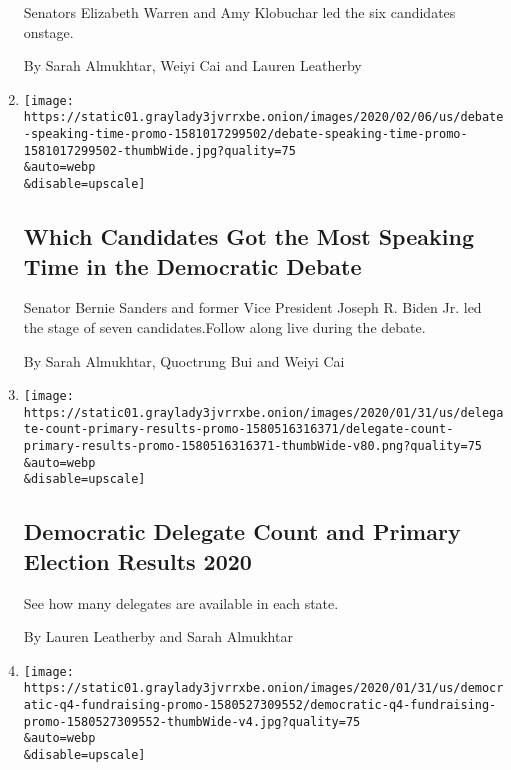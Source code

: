 \begin{enumerate}
  Senators Elizabeth Warren and Amy Klobuchar led the six candidates
  onstage.

  By Sarah Almukhtar, Weiyi Cai and Lauren Leatherby
\item
  \href{/interactive/2020/02/07/us/elections/debate-speaking-time.html}{}

  \texttt{[image: https://static01.graylady3jvrrxbe.onion/images/2020/02/06/us/debate-speaking-time-promo-1581017299502/debate-speaking-time-promo-1581017299502-thumbWide.jpg?quality=75\\\&auto=webp\\\&disable=upscale]}

  \hypertarget{which-candidates-got-the-most-speaking-time-in-the-democratic-debate-1}{%
  \subsection{Which Candidates Got the Most Speaking Time in the
  Democratic
  Debate}\label{which-candidates-got-the-most-speaking-time-in-the-democratic-debate-1}}

  Senator Bernie Sanders and former Vice President Joseph R. Biden Jr.
  led the stage of seven candidates.Follow along live during the debate.

  By Sarah Almukhtar, Quoctrung Bui and Weiyi Cai
\item
  \href{/interactive/2020/us/elections/delegate-count-primary-results.html}{}

  \texttt{[image: https://static01.graylady3jvrrxbe.onion/images/2020/01/31/us/delegate-count-primary-results-promo-1580516316371/delegate-count-primary-results-promo-1580516316371-thumbWide-v80.png?quality=75\\\&auto=webp\\\&disable=upscale]}

  \hypertarget{democratic-delegate-count-and-primary-election-results-2020}{%
  \subsection{Democratic Delegate Count and Primary Election Results
  2020}\label{democratic-delegate-count-and-primary-election-results-2020}}

  See how many delegates are available in each state.

  By Lauren Leatherby and Sarah Almukhtar
\item
  \href{/interactive/2020/02/01/us/elections/democratic-q4-fundraising.html}{}

  \texttt{[image: https://static01.graylady3jvrrxbe.onion/images/2020/01/31/us/democratic-q4-fundraising-promo-1580527309552/democratic-q4-fundraising-promo-1580527309552-thumbWide-v4.jpg?quality=75\\\&auto=webp\\\&disable=upscale]}


\end{enumerate}
